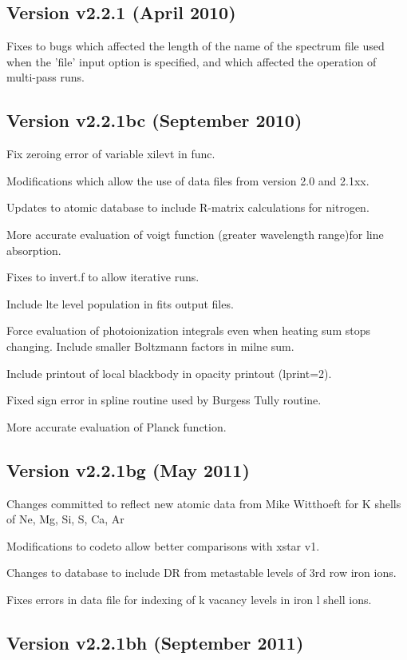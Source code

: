 \subsection{Version v2.2.1 (April 2010)}

Fixes to bugs which affected the length of the name of the spectrum file used when 
the 'file' input option is specified, and which affected the operation of multi-pass runs.

\subsection{Version v2.2.1bc (September 2010)}

Fix zeroing error of variable xilevt in func.

Modifications which allow the use of data files from version 2.0 and 2.1xx.

Updates to atomic database to include R-matrix calculations for nitrogen.

More accurate evaluation of voigt function (greater wavelength range)for line absorption.

Fixes to invert.f to allow iterative runs.

Include lte level population in fits output files.

Force evaluation of photoionization integrals even when heating sum  stops changing.  Include smaller Boltzmann factors in milne sum.

Include printout of local blackbody in opacity printout (lprint=2).

Fixed sign error in spline routine used by Burgess Tully routine.

More accurate evaluation of Planck function.

\subsection{Version v2.2.1bg (May 2011)}

Changes committed to reflect new atomic data from Mike Witthoeft
for K shells of Ne, Mg, Si, S, Ca, Ar

Modifications to codeto allow better comparisons with xstar v1.

Changes to database to include DR from metastable levels of 3rd
row iron ions.

Fixes errors in data file for indexing of k vacancy levels in
iron l shell ions.

\subsection{Version v2.2.1bh (September 2011)}

